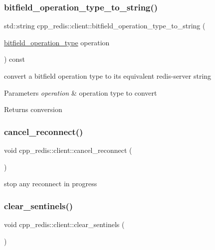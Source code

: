 \subsubsection{\texorpdfstring{bitfield\+\_\+operation\+\_\+type\+\_\+to\+\_\+string()}{bitfield\_operation\_type\_to\_string()}}
{\footnotesize\ttfamily std\+::string cpp\+\_\+redis\+::client\+::bitfield\+\_\+operation\+\_\+type\+\_\+to\+\_\+string (\begin{DoxyParamCaption}\item[{\mbox{\hyperlink{classcpp__redis_1_1client_a2e2023534299541da0a659802e2f087d}{bitfield\+\_\+operation\+\_\+type}}}]{operation }\end{DoxyParamCaption}) const}

convert a bitfield operation type to its equivalent redis-\/server string


\begin{DoxyParams}{Parameters}
{\em operation} & operation type to convert \\
\hline
\end{DoxyParams}
\begin{DoxyReturn}{Returns}
conversion 
\end{DoxyReturn}
\mbox{\label{classcpp__redis_1_1client_a0ad596a7cd553e18f75cdd78a99d1b05}} 
\subsubsection{\texorpdfstring{cancel\+\_\+reconnect()}{cancel\_reconnect()}}
{\footnotesize\ttfamily void cpp\+\_\+redis\+::client\+::cancel\+\_\+reconnect (\begin{DoxyParamCaption}{ }\end{DoxyParamCaption})}

stop any reconnect in progress \mbox{\label{classcpp__redis_1_1client_ad693f26b02113e4a776856aca8dd7796}} 
\subsubsection{\texorpdfstring{clear\+\_\+sentinels()}{clear\_sentinels()}}
{\footnotesize\ttfamily void cpp\+\_\+redis\+::client\+::clear\+\_\+sentinels (\begin{DoxyParamCaption}{ }\end{DoxyParamCaption})}

